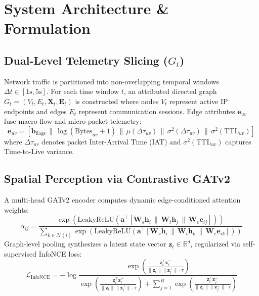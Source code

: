 \documentclass[conference]{IEEEtran}
\begin{document}
\section{System Architecture \& Formulation}

\subsection{Dual-Level Telemetry Slicing ($G_t$)}
Network traffic is partitioned into non-overlapping temporal windows $\Delta t \in [1\text{s}, 5\text{s}]$. For each time window $t$, an attributed directed graph $G_t = (V_t, E_t, \mathbf{X}_t, \mathbf{E}_t)$ is constructed where nodes $V_t$ represent active IP endpoints and edges $E_t$ represent communication sessions. Edge attributes $\mathbf{e}_{uv}$ fuse macro-flow and micro-packet telemetry:
\begin{equation}
\mathbf{e}_{uv} = \left[ \mathbf{b}_{\text{flags}} \,\|\, \log(\text{Bytes}_{uv} + 1) \,\|\, \mu(\Delta \tau_{uv}) \,\|\, \sigma^2(\Delta \tau_{uv}) \,\|\, \sigma^2(\text{TTL}_{uv}) \right]
\end{equation}
where $\Delta \tau_{uv}$ denotes packet Inter-Arrival Time (IAT) and $\sigma^2(\text{TTL}_{uv})$ captures Time-to-Live variance.

\subsection{Spatial Perception via Contrastive GATv2}
A multi-head GATv2 encoder computes dynamic edge-conditioned attention weights:
\begin{equation}
\alpha_{ij} = \frac{\exp\left(\text{LeakyReLU}\left(\mathbf{a}^\top \left[ \mathbf{W}_s \mathbf{h}_i \,\|\, \mathbf{W}_t \mathbf{h}_j \,\|\, \mathbf{W}_e \mathbf{e}_{ij} \right]\right)\right)}{\sum_{k \in \mathcal{N}(i)} \exp\left(\text{LeakyReLU}\left(\mathbf{a}^\top \left[ \mathbf{W}_s \mathbf{h}_i \,\|\, \mathbf{W}_t \mathbf{h}_k \,\|\, \mathbf{W}_e \mathbf{e}_{ik} \right]\right)\right)}
\end{equation}
Graph-level pooling synthesizes a latent state vector $\mathbf{z}_t \in \mathbb{R}^d$, regularized via self-supervised InfoNCE loss:
\begin{equation}
\mathcal{L}_{\text{InfoNCE}} = -\log \frac{\exp\left(\frac{\mathbf{z}_t^\top \mathbf{z}_t^+}{\|\mathbf{z}_t\| \|\mathbf{z}_t^+\| \cdot \tau}\right)}{\exp\left(\frac{\mathbf{z}_t^\top \mathbf{z}_t^+}{\|\mathbf{z}_t\| \|\mathbf{z}_t^+\| \cdot \tau}\right) + \sum_{j=1}^B \exp\left(\frac{\mathbf{z}_t^\top \mathbf{z}_j^-}{\|\mathbf{z}_t\| \|\mathbf{z}_j^-\| \cdot \tau}\right)}
\end{equation}
\end{document}
